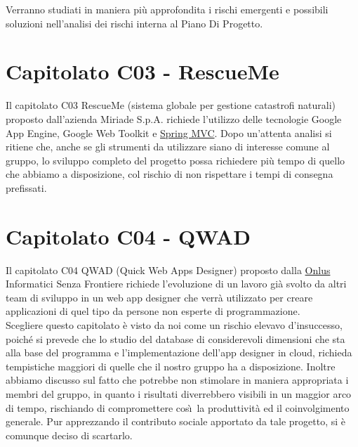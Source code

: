 Verranno studiati in maniera pi\`u approfondita i rischi emergenti e possibili
soluzioni nell'analisi dei rischi interna al Piano Di Progetto.

\chapter{Capitolato C03 - RescueMe}
\thispagestyle{fancy}
Il capitolato C03 RescueMe (sistema globale per gestione catastrofi naturali)
proposto dall'azienda Miriade S.p.A. richiede l'utilizzo delle tecnologie
Google App Engine, Google Web Toolkit e \underline{Spring MVC}. Dopo un'attenta
analisi si ritiene che, anche se gli strumenti da utilizzare siano di
interesse comune al gruppo, lo sviluppo completo del progetto possa richiedere
pi\`u tempo di quello che abbiamo a disposizione, col rischio di non rispettare
i tempi di consegna prefissati.

\chapter{Capitolato C04 - QWAD}
\thispagestyle{fancy}
Il capitolato C04 QWAD (Quick Web Apps Designer) proposto dalla \underline{Onlus}
Informatici Senza Frontiere richiede l'evoluzione di un lavoro gi\`a
svolto da altri team di sviluppo in un web app designer che
verr\`a utilizzato per creare applicazioni di quel tipo da persone non esperte
di programmazione.\\

Scegliere questo capitolato \`e visto da noi come un rischio elevavo
d'insuccesso, poich\'e si prevede che lo studio del database di considerevoli
dimensioni che sta alla base del programma e l'implementazione dell'app
designer in cloud, richieda tempistiche maggiori di quelle che il
nostro gruppo ha a disposizione. Inoltre abbiamo discusso sul fatto
che potrebbe non stimolare in maniera appropriata i membri del gruppo, in quanto
i risultati diverrebbero visibili in un maggior arco di tempo, rischiando di
compromettere cos\`\i\ la produttivit\`a ed il coinvolgimento generale. Pur
apprezzando il contributo sociale apportato da tale progetto, si \`e comunque
deciso di scartarlo.

